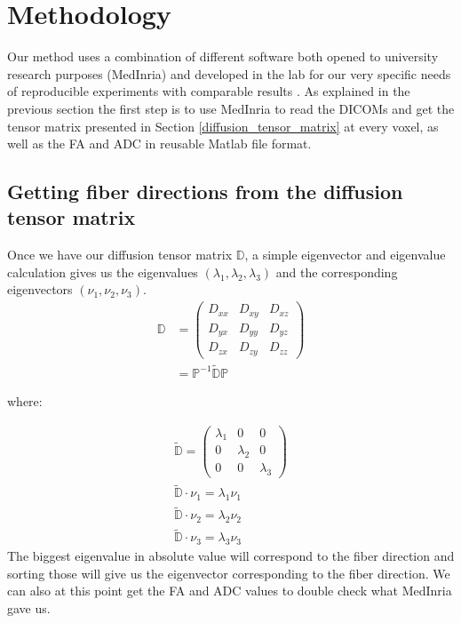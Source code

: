 \chapter{Methodology}

Our method uses a combination of different software both opened to university research purposes (MedInria) and developed in the lab for our very specific needs of reproducible experiments with comparable results \cite{piuzephd}. As explained in the previous section the first step is to use MedInria to read the DICOMs and get the tensor matrix presented in Section \ref{diffusion_tensor_matrix} at every voxel, as well as the FA and ADC in reusable Matlab file format.

\section{Getting fiber directions from the diffusion tensor matrix}

Once we have our diffusion tensor matrix $\mathbb{D}$, a simple eigenvector and eigenvalue calculation gives us the eigenvalues $(\lambda_1, \lambda_2, \lambda_3)$ and the corresponding eigenvectors $(\nu_1, \nu_2, \nu_3)$.
\begin{align}
    \mathbb{D} &= \begin{pmatrix}
        D_{xx} & D_{xy} & D_{xz} \\
        D_{yx} & D_{yy} & D_{yz} \\
        D_{zx} & D_{zy} & D_{zz}
        \end{pmatrix} \\
    &= \mathbb{P}^{-1} \mathbb{\tilde{D}P}
\end{align}

where:

\begin{gather*}
    \mathbb{\tilde{D}} = \begin{pmatrix}
        \lambda_1 & 0 & 0 \\
        0 & \lambda_2 & 0 \\
        0 & 0 & \lambda_3
        \end{pmatrix} \\
    \mathbb{\tilde{D}}\cdot \nu_1 = \lambda_1 \nu_1 \\
    \mathbb{\tilde{D}}\cdot \nu_2 = \lambda_2 \nu_2 \\
    \mathbb{\tilde{D}}\cdot \nu_3 = \lambda_3 \nu_3
\end{gather*}
The biggest eigenvalue in absolute value will correspond to the fiber direction and sorting those will give us the eigenvector corresponding to the fiber direction. We can also at this point get the FA and ADC values to double check what MedInria gave us.

